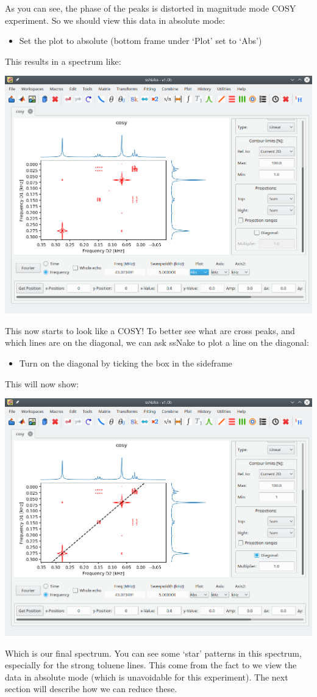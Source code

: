 \documentclass[11pt,a4paper]{article}
\begin{document}
As you can see, the phase of the peaks is distorted in magnitude mode COSY experiment.
So we should view this data in absolute mode:
\begin{itemize}
  \item Set the plot to absolute (bottom frame under `Plot' set to `Abs')
\end{itemize}
This results in a spectrum like:
\begin{center}
\includegraphics[width=0.8\linewidth]{Figs/Fig4.png}
\end{center}
This now starts to look like a COSY!
To better see what are cross peaks, and which lines are on the diagonal, we can ask ssNake to plot a line on the diagonal:
\begin{itemize}
  \item Turn on the diagonal by ticking the box in the sideframe
\end{itemize}
This will now show:
\begin{center}
\includegraphics[width=0.8\linewidth]{Figs/Fig5.png}
\end{center}
Which is our final spectrum.
You can see some `star' patterns in this spectrum, especially for the strong toluene lines.
This come from the fact to we view the data in absolute mode (which is unavoidable for this experiment).
The next section will describe how we can reduce these. 
\end{document}
